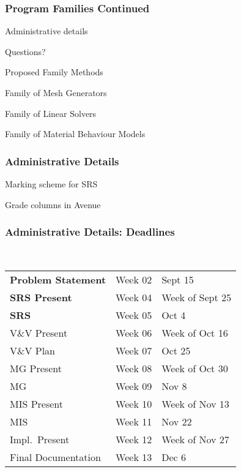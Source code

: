 \documentclass[t,12pt,numbers,fleqn]{beamer}
\begin{document}



\begin{frame}
\frametitle{Program Families Continued}

\bi
\item Administrative details
\item Questions?
\item Proposed Family Methods
\item Family of Mesh Generators
\item Family of Linear Solvers
\item Family of Material Behaviour Models
\ei
\end{frame}


\begin{frame}
\frametitle{Administrative Details}

\bi
\item Marking scheme for SRS
\item Grade columns in Avenue
\ei

\end{frame}


\begin{frame}
\frametitle{Administrative Details: Deadlines}
~\newline
\begin{tabular}{l l l}
\textbf{Problem Statement} & Week 02 & Sept 15\\
\textbf{SRS Present} & Week 04 & Week of Sept 25\\
\textbf{SRS} & Week 05 & Oct 4\\
V\&V Present & Week 06 & Week of Oct 16\\
V\&V Plan & Week 07 & Oct 25\\
MG Present & Week 08 & Week of Oct 30\\
MG & Week 09 & Nov 8\\
MIS Present & Week 10 & Week of Nov 13\\
MIS & Week 11 & Nov 22\\
Impl.\ Present & Week 12 & Week of Nov 27\\
Final Documentation & Week 13 & Dec 6\\
\end {tabular}

\end{frame}
\end{document}

